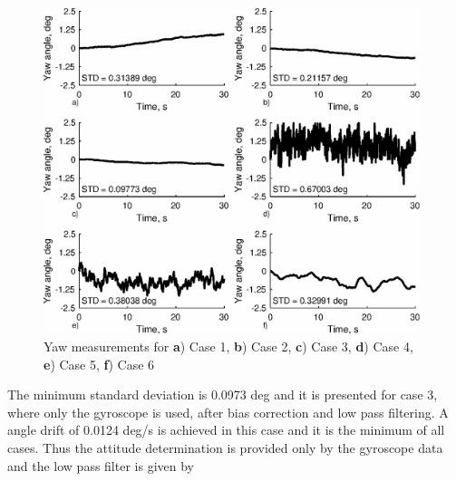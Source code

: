 \documentclass[aerospace,article,submit,moreauthors,dvi2pdf]{Definitions/mdpi}
\begin{document}
\begin{figure}[H]
\includegraphics[width=11cm]{IMUbiases.eps}
\caption{Yaw measurements for \textbf{a}) Case 1, \textbf{b}) Case 2, \textbf{c}) Case 3, \textbf{d}) Case 4, \textbf{e}) Case 5, \textbf{f}) Case 6 \label{fig:imubiases}}
\end{figure}
The minimum standard deviation is 0.0973 deg and it is presented for case 3, where only the gyroscope is used, after bias correction and low pass filtering. A angle drift of 0.0124 deg/s is achieved in this case and it is the minimum of all cases. Thus the attitude determination is provided only by the gyroscope data and the low pass filter is given by
\end{document}
